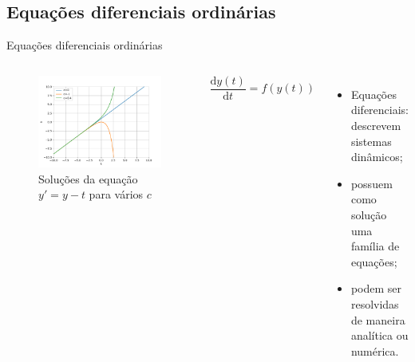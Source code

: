 \subsection*{Equações diferenciais ordinárias}
\begin{frame}{Equações diferenciais ordinárias}
	\begin{columns}[t]
		\column{5cm}
			\begin{figure}
				\centering
				\caption{Soluções da equação $y'=y-t$ para vários $c$}
				\label{fig:solucao}
				\includegraphics[width=\linewidth]{figs/solucao}
			\end{figure}
		\column{5cm}
			\[
				\frac{\mathrm{d}y(t)}{\mathrm{d}t}=f(y(t))
			\]
			\begin{itemize}
				\item Equações diferenciais: descrevem sistemas dinâmicos;
				\item possuem como solução uma família de equações;
				\item podem ser resolvidas de maneira analítica ou numérica.
			\end{itemize}
	\end{columns}
\end{frame}

